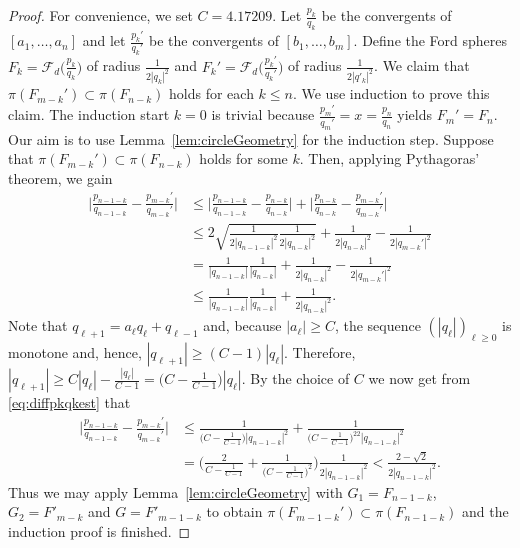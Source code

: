 \documentclass[graybox]{svmult}
\begin{document}
\begin{proof}
For convenience, we set $C=4.17209$. Let $\frac{p_k}{q_k}$ be the convergents of $[a_1,\ldots, a_n]$ and let $\frac{p_k'}{q_k'}$ be the convergents of $[b_1,\ldots, b_m]$.  Define the Ford spheres $F_k=\mathcal{F}_d\big(\frac{p_k}{q_k}\big)$ of radius $\frac1{2|q_k|^2}$ and $F_k'=\mathcal{F}_d\big(\frac{p_k'}{q_k'}\big)$ of radius $\frac1{2|q'_k|^2}$. We claim that $\pi(F_{m-k}') \subset \pi(F_{n-k})$ holds for each $k\le n$. We use induction to prove this claim. The induction start $k=0$ is trivial because $\frac{p_m'}{q_m'}=x=\frac{p_n}{q_n}$ yields  $F_m'=F_n$. Our aim is to use Lemma~\ref{lem:circleGeometry} for the induction step. Suppose that $\pi(F_{m-k}') \subset \pi(F_{n-k})$ holds for some $k$. Then, applying Pythagoras' theorem, we gain  
\begin{equation}\label{eq:diffpkqkest}
\begin{split}
\bigg|\frac{p_{n-1-k}}{q_{n-1-k}} - \frac{p_{m-k}'}{q_{m-k}'}\bigg|
&\le 
\bigg|\frac{p_{n-1-k}}{q_{n-1-k}} - \frac{p_{n-k}}{q_{n-k}}\bigg|
+
\bigg|\frac{p_{n-k}}{q_{n-k}} - \frac{p_{m-k}'}{q_{m-k}'}\bigg| \\
&\le 
2\sqrt{\frac{1}{2|q_{{n-1}-k}|^2} \frac{1}{2|q_{n-k}|^2}}
+
\frac{1}{2|q_{n-k}|^2} - \frac{1}{2|q_{m-k}'|^2}\\
&=
\frac{1}{|q_{{n-1}-k}|} \frac{1}{|q_{n-k}|}
+
\frac{1}{2|q_{n-k}|^2} - \frac{1}{2|q_{m-k}'|^2} \\
&\le \frac{1}{|q_{{n-1}-k}|} \frac{1}{|q_{n-k}|} +
\frac{1}{2|q_{n-k}|^2}.
\end{split}
\end{equation}
Note that $q_{\ell+1}=a_\ell q_\ell + q_{\ell-1}$ and, because $|a_\ell| \ge C$, the sequence $(|q_\ell|)_{\ell \ge 0}$ is monotone and, hence, $|q_{\ell+1}| \ge (C-1) |q_\ell|$. Therefore, $|q_{\ell+1}| \ge C|q_{\ell}| - \frac{|q_\ell|}{C-1} = \big(C-\frac1{C-1}\big)|q_\ell|$.
By the choice of $C$ we now get from \eqref{eq:diffpkqkest} that
\begin{equation*}
\begin{split}
\bigg|\frac{p_{n-1-k}}{q_{n-1-k}} - \frac{p_{m-k}'}{q_{m-k}'}\bigg|
&\le 
\frac{1}{\big(C-\frac{1}{C-1}\big)|q_{{n-1}-k}|^2} + \frac{1}{\big(C-\frac{1}{C-1}\big)^22|q_{{n-1}-k}|^2}
\\&=
\bigg( \frac{2}{C-\frac{1}{C-1}} + \frac{1}{\big(C-\frac{1}{C-1}\big)^2}
\bigg)\frac{1}{2|q_{{n-1}-k}|^2}
 < \frac{2-\sqrt{2}}{2|q_{{n-1}-k}|^2}.
\end{split}
\end{equation*}
Thus we may apply Lemma~\ref{lem:circleGeometry} with $G_1=F_{n-1-k}$, $G_2=F'_{m-k}$ and $G=F'_{m-1-k}$ to obtain $\pi(F_{m-1-k}') \subset \pi(F_{n-1-k})$ and the induction proof is finished.


\end{proof}
\end{document}
